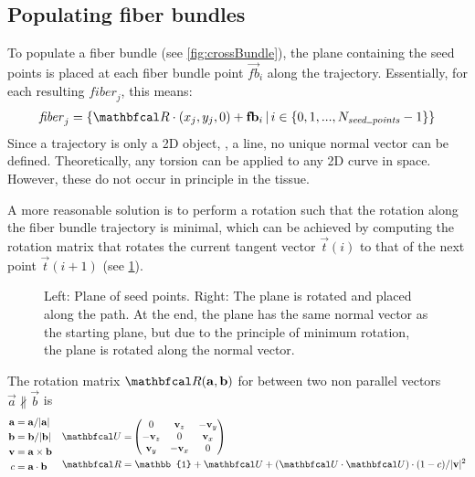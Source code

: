 \subsection{Populating fiber bundles}\label{sec:fillBundle}
%
To populate a fiber bundle (see \cref{fig:crossBundle}), the plane containing the seed points is placed at each fiber bundle point $\vec{fb}_i$ along the trajectory.
Essentially, for each resulting $\mathit{fiber}_j$, this means:
%
\begin{align}
    \mathit{fiber}_j = \left\{ \mat{R} \cdot (x_j, y_j, 0) + \vec{fb}_i \, | \, i \in \{0,1,...,N_{\mathit{seed\tum{}points}}-1\}\right\}
\end{align}
%
Since a trajectory is only a 2D object, \ie{}, a line, no unique normal vector can be defined.
Theoretically, any torsion can be applied to any 2D curve in space.
However, these do not occur in principle in the tissue.
\par
%
A more reasonable solution is to perform a rotation such that the rotation along the fiber bundle trajectory is minimal, which can be achieved by computing the rotation matrix that rotates the current tangent vector $\vec{t}(i)$ to that of the next point $\vec{t}(i+1)$ (see \cref{fig:torsion}).
%
\begin{figure}[!t]
    \centering
    \setlength{\tikzwidth}{0.75\textwidth}
    \caption[]{Left: Plane of seed points. Right: The plane is rotated and placed along the path. At the end, the plane has the same normal vector as the starting plane, but due to the principle of minimum rotation, the plane is rotated along the normal vector.}
    \label{fig:torsion}
\end{figure}
%
The rotation matrix $\mat{R}(\vec{a}, \vec{b})$ for between two non parallel vectors $\vec{a} \nparallel \vec{b}$ is
\begin{align}
\begin{split}
    \vec{a} =& \; \vec{a} / |\vec{a}|\\
    \vec{b} =& \; \vec{b} / |\vec{b}|\\
    \vec{v} =& \; \vec{a} \times \vec{b}\\
    c =& \; \vec{a} \cdot \vec{b}
\end{split}
\quad
\begin{split}
    \mat{U} =& \begin{pmatrix} 0 & \vec{v}_z & -\vec{v}_y\\ -\vec{v}_z & 0 & \vec{v}_x\\ \vec{v}_y & -\vec{v}_x & 0\end{pmatrix}\\
    \mat{R} =& \; \mathbb{1} + \mat{U} + (\mat{U} \cdot \mat{U}) \cdot (1 - c) / |\vec{v}|^2
\end{split}
\end{align}
